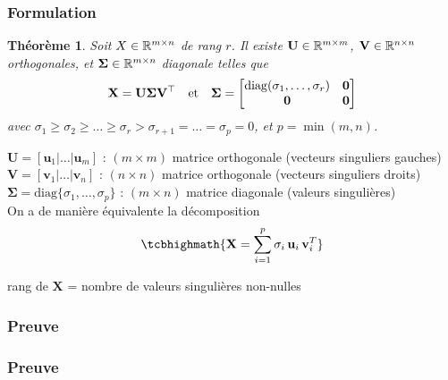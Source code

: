 \documentclass[9pt]{beamer}
\newtheorem{theo}{Théorème}
\begin{document}
\begin{frame}
\frametitle{Formulation}


\begin{theo} Soit $X \in \mathbb{R}^{m\times n}$ de rang $r$. Il existe $\mathbf{U} \in \mathbb{R}^{m\times m}$, $\mathbf{V} \in \mathbb{R}^{n\times n}$ \alert{orthogonales}, et $\bm{\Sigma} \in \mathbb{R}^{m\times n}$ \alert{diagonale} telles que
$$
	\mathbf{X} = \mathbf{U} \bm{\Sigma} \mathbf{V}^\top \quad\text{et}\quad \bm{\Sigma} = \begin{bmatrix} \mathop{\mathrm{diag}}(\sigma_1,\ldots,\sigma_r) & \large\bm{0} \\ \large\bm{0} & \large\bm{0} \end{bmatrix}
$$
avec $\sigma_1 \geq \sigma_2 \geq \ldots \geq \sigma_r > \sigma_{r+1} = \ldots = \sigma_p = 0$, et $p=\min(m,n)$.
\end{theo}



$\mathbf{U} = [\mathbf{u}_1 | \dots | \mathbf{u}_m ]$ : $(m \times m)$  matrice orthogonale (vecteurs singuliers gauches)\\[1ex]

$\mathbf{V} = [\mathbf{v}_1 | \dots | \mathbf{v}_n ]$ : $(n\times n)$ matrice orthogonale (vecteurs singuliers droits)\\[1ex]

 $\bm{\Sigma} = \text{diag}\{\sigma_1, \dots,  \sigma_p \}$ :  $(m \times n)$   matrice diagonale (valeurs singulières)\\[2ex] 
 
On a de manière équivalente la \alert{décomposition}
$$\tcbhighmath{
\mathbf{X} = \sum_{i=1}^p \sigma_i \, \mathbf{u}_i \,  \mathbf{v}_i^T}
$$

rang de $\mathbf{X}$ = nombre de valeurs singulières non-nulles

\end{frame}


\begin{frame}
\frametitle{Preuve}
\end{frame}

\begin{frame}
\frametitle{Preuve}
\end{frame}
\end{document}
